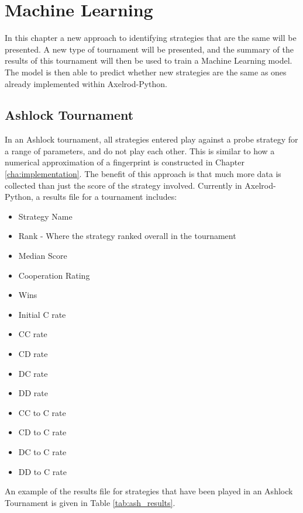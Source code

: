 
\chapter{Machine Learning}\label{cha:machinelearning}

In this chapter a new approach to identifying strategies that are the same will be presented.
A new type of tournament will be presented, and the summary of the results of this tournament will then be used to train a Machine Learning model.
The model is then able to predict whether new strategies are the same as ones already implemented within Axelrod-Python.



\section{Ashlock Tournament}\label{sec:ashlock_tourn}

In an Ashlock tournament, all strategies entered play against a probe strategy for a range of parameters, and do not play each other.
This is similar to how a numerical approximation of a fingerprint is constructed in Chapter \ref{cha:implementation}.
The benefit of this approach is that much more data is collected than just the score of the strategy involved.
Currently in Axelrod-Python, a results file for a tournament includes:

\begin{itemize}
    \item Strategy Name
    \item Rank - Where the strategy ranked overall in the tournament
    \item Median Score
    \item Cooperation Rating
    \item Wins
    \item Initial C rate
    \item CC rate
    \item CD rate
    \item DC rate
    \item DD rate
    \item CC to C rate
    \item CD to C rate
    \item DC to C rate
    \item DD to C rate
\end{itemize}

An example of the results file for strategies that have been played in an Ashlock Tournament is given in Table \ref{tab:ash_results}.

